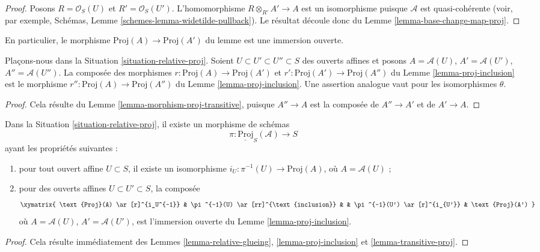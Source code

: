 \begin{proof}
Posons $R = \mathcal{O}_S(U)$ et $R' = \mathcal{O}_S(U')$.
L'homomorphisme $R \otimes_{R'} A' \to A$ est un isomorphisme puisque
$\mathcal{A}$ est quasi-cohérente (voir, par exemple, Schémas,
Lemme \ref{schemes-lemma-widetilde-pullback}). Le résultat découle donc du
Lemme \ref{lemma-base-change-map-proj}.
\end{proof}

\noindent
En particulier, le morphisme $\text{Proj}(A) \to \text{Proj}(A')$ du lemme
est une immersion ouverte.

\begin{lemma}
\label{lemma-transitive-proj}
Plaçons-nous dans la Situation \ref{situation-relative-proj}.
Soient $U \subset U' \subset U'' \subset S$ des ouverts affines et posons
$A = \mathcal{A}(U)$, $A' = \mathcal{A}(U')$, $A'' = \mathcal{A}(U'')$.
La composée des morphismes $r : \text{Proj}(A) \to \text{Proj}(A')$ et
$r' : \text{Proj}(A') \to \text{Proj}(A'')$ du
Lemme \ref{lemma-proj-inclusion} est le morphisme
$r'' : \text{Proj}(A) \to \text{Proj}(A'')$ du
Lemme \ref{lemma-proj-inclusion}. Une assertion analogue vaut pour les
isomorphismes $\theta$.
\end{lemma}

\begin{proof}
Cela résulte du Lemme \ref{lemma-morphism-proj-transitive}, puisque
$A'' \to A$ est la composée de $A'' \to A'$ et de $A' \to A$.
\end{proof}

\begin{lemma}
\label{lemma-glue-relative-proj}
Dans la Situation \ref{situation-relative-proj}, il existe un morphisme
de schémas
$$
\pi : \underline{\text{Proj}}_S(\mathcal{A}) \longrightarrow S
$$
ayant les propriétés suivantes :
\begin{enumerate}
\item pour tout ouvert affine $U \subset S$, il existe un isomorphisme
$i_U : \pi^{-1}(U) \to \text{Proj}(A)$, où $A = \mathcal{A}(U)$ ;
\item pour des ouverts affines $U \subset U' \subset S$, la composée
$$
\xymatrix{
\text{Proj}(A) \ar[r]^{i_U^{-1}} &
\pi^{-1}(U) \ar[rr]^{\text{inclusion}} & &
\pi^{-1}(U') \ar[r]^{i_{U'}} &
\text{Proj}(A')
}
$$
où $A = \mathcal{A}(U)$, $A' = \mathcal{A}(U')$, est l'immersion ouverte du
Lemme \ref{lemma-proj-inclusion}.
\end{enumerate}
\end{lemma}

\begin{proof}
Cela résulte immédiatement des Lemmes \ref{lemma-relative-glueing},
\ref{lemma-proj-inclusion} et \ref{lemma-transitive-proj}.
\end{proof}


